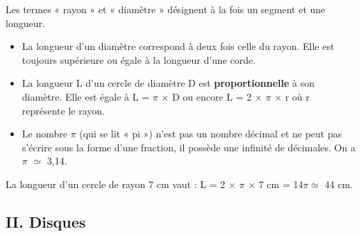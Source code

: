 \begin{Définitions*}[c]
\begin{minipage}[c]{0.3\textwidth}
\begin{center}
\end{center}

\end{minipage}
\end{Définitions*}

\begin{Remarque}
Les termes « rayon » et « diamètre » désignent à la fois un segment et une longueur.
\end{Remarque}

\begin{Propriétés*}
\leavevmode\vspace{-\baselineskip}
\begin{itemize}[label=\textcolor{Couleur1}{$\bullet$}]
\item La longueur d'un diamètre correspond à deux fois celle du rayon. Elle est toujours supérieure ou égale à la longueur d'une corde.
\item La longueur L d'un cercle de diamètre D est \textbf{proportionnelle} à son diamètre. Elle est égale à L = $\pi$ × D ou encore L = 2 × $\pi$ × r où r représente le rayon.
\item Le nombre $\pi$ (qui se lit « pi ») n'est pas un nombre décimal et ne peut pas s'écrire sous la forme d'une fraction, il possède une infinité de décimales. On a $\pi$ $\simeq$ 3,14.
\end{itemize}
\end{Propriétés*}



\begin{Exemple}
La longueur d'un cercle de rayon 7 cm vaut : L = 2 × $\pi$ × 7 cm = 14$\pi\simeq$ 44 cm.
\end{Exemple}


\subsection*{II. Disques}

